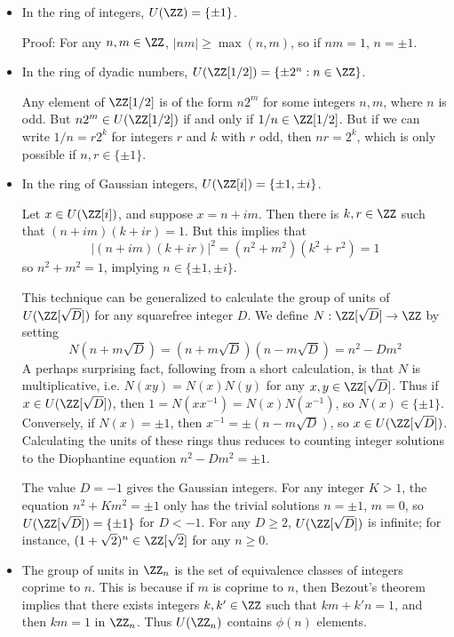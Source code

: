 \begin{itemize}
    \item In the ring of integers, $U(\ZZ) = \{ \pm 1 \}$.

    Proof: For any $n,m \in \ZZ$, $|nm| \geq \max(n,m)$, so if $nm = 1$, $n = \pm 1$.

    \item In the ring of dyadic numbers, $U(\ZZ[1/2]) = \{ \pm 2^n : n \in \ZZ \}$.

    Any element of $\ZZ[1/2]$ is of the form $n 2^m$ for some integers $n,m$, where $n$ is odd. But $n 2^m \in U(\ZZ[1/2])$ if and only if $1/n \in \ZZ[1/2]$. But if we can write $1/n = r 2^k$ for integers $r$ and $k$ with $r$ odd, then $nr = 2^k$, which is only possible if $n,r \in \{ \pm 1 \}$.

    \item In the ring of Gaussian integers, $U(\ZZ[i]) = \{ \pm 1, \pm i \}$.

    Let $x \in U(\ZZ[i])$, and suppose $x = n + im$. Then there is $k,r \in \ZZ$ such that $(n + im)(k + ir) = 1$. But this implies that
    \[ |(n + im)(k + ir)|^2 = (n^2 + m^2)(k^2 + r^2) = 1 \]
    so $n^2 + m^2 = 1$, implying $n \in \{ \pm 1, \pm i \}$.

    This technique can be generalized to calculate the group of units of $U(\ZZ[\sqrt{D}])$ for any squarefree integer $D$. We define $N: \ZZ[\sqrt{D}] \to \ZZ$ by setting
    \[ N(n + m \sqrt{D}) = \left(n + m\sqrt{D} \right) \left(n - m\sqrt{D} \right) = n^2 - D m^2 \]
    A perhaps surprising fact, following from a short calculation, is that $N$ is multiplicative, i.e. $N(xy) = N(x) N(y)$ for any $x,y \in \ZZ[\sqrt{D}]$. Thus if $x \in U(\ZZ[\sqrt{D}])$, then $1 = N(xx^{-1}) = N(x) N(x^{-1})$, so $N(x) \in \{ \pm 1 \}$. Conversely, if $N(x) = \pm 1$, then $x^{-1} = \pm (n - m \sqrt{D})$, so $x \in U(\ZZ[\sqrt{D}])$. Calculating the units of these rings thus reduces to counting integer solutions to the Diophantine equation $n^2 - D m^2 = \pm 1$.

    The value $D = -1$ gives the Gaussian integers. For any integer $K > 1$, the equation $n^2 + K m^2 = \pm 1$ only has the trivial solutions $n = \pm 1$, $m = 0$, so $U(\ZZ[\sqrt{D}]) = \{ \pm 1 \}$ for $D < -1$. For any $D \geq 2$, $U(\ZZ[\sqrt{D}])$ is infinite; for instance, $(1 + \sqrt{2})^n \in \ZZ[\sqrt{2}]$ for any $n \geq 0$.

    \item The group of units in $\ZZ_n$ is the set of equivalence classes of integers coprime to $n$. This is because if $m$ is coprime to $n$, then Bezout's theorem implies that there exists integers $k,k' \in \ZZ$ such that $km + k'n = 1$, and then $km = 1$ in $\ZZ_n$. Thus $U(\ZZ_n)$ contains $\phi(n)$ elements.


\end{itemize}
